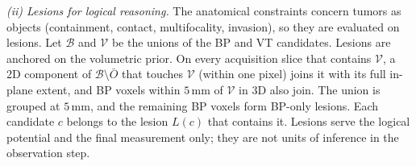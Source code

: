 \documentclass[fleqn,10pt]{olplainarticle}
\begin{document}
\textit{(ii) Lesions for logical reasoning.} The anatomical constraints concern tumors as objects (containment, contact,
multifocality, invasion), so they are evaluated on lesions. Let $\mathcal{B}$ and $\mathcal{V}$ be the unions of the BP
and VT candidates. Lesions are anchored on the volumetric prior. On every acquisition slice that contains $\mathcal{V}$, a 2D
component of $\mathcal{B}\setminus\bar O$ that touches $\mathcal{V}$ (within one pixel) joins it with its full in-plane
extent, and BP voxels within $5$\,mm of $\mathcal{V}$ in 3D also join. The union is grouped at $5$\,mm, and the remaining BP
voxels form BP-only lesions. Each candidate $c$ belongs to the lesion $L(c)$ that contains it. Lesions serve the logical
potential and the final measurement only; they are not units of inference in the observation step.
\end{document}
